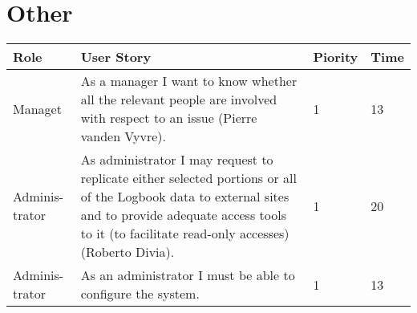 \section{Other}
\begin{longtable}{ | p{2cm} | p{8cm} | p{1.5cm} | l |}
\hline
Role & User Story & Piority & Time \\ \hline
Managet & As a manager I want to know whether all the relevant people are
involved with respect to an issue (Pierre vanden Vyvre). & 1 & 13 \\ \hline
Adminis-trator & As administrator I may request to replicate either selected portions
or all of the Logbook data to external sites and to provide adequate access tools to it (to facilitate read-only accesses) (Roberto Divia). & 1 & 20 \\ \hline
Adminis-trator & As an administrator I must be able to configure the system. & 1 & 13 \\ \hline


\end{longtable}

